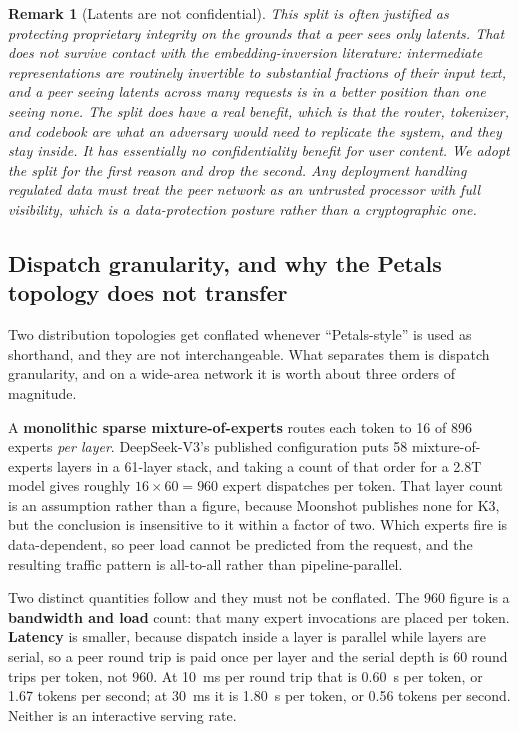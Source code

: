 \documentclass[11pt]{article}
\newtheorem{remark}{Remark}
\begin{document}
\begin{remark}[Latents are not confidential]
\label{rem:latentleak}
This split is often justified as protecting proprietary integrity on the grounds that a peer sees only latents. That does not survive contact with the embedding-inversion literature: intermediate representations are routinely invertible to substantial fractions of their input text, and a peer seeing latents across many requests is in a better position than one seeing none. The split does have a real benefit, which is that the router, tokenizer, and codebook are what an adversary would need to \emph{replicate} the system, and they stay inside. It has essentially no confidentiality benefit for user content. We adopt the split for the first reason and drop the second. Any deployment handling regulated data must treat the peer network as an untrusted processor with full visibility, which is a data-protection posture rather than a cryptographic one.
\end{remark}

\subsection{Dispatch granularity, and why the Petals topology does not transfer}
\label{sec:dispatch}

Two distribution topologies get conflated whenever ``Petals-style'' is used as shorthand, and they are not interchangeable. What separates them is dispatch granularity, and on a wide-area network it is worth about three orders of magnitude.

A \textbf{monolithic sparse mixture-of-experts} routes each token to 16 of 896 experts \emph{per layer}. DeepSeek-V3's published configuration puts 58 mixture-of-experts layers in a 61-layer stack, and taking a count of that order for a 2.8T model gives roughly $16 \times 60 = 960$ expert dispatches per token. That layer count is an assumption rather than a figure, because Moonshot publishes none for K3, but the conclusion is insensitive to it within a factor of two. Which experts fire is data-dependent, so peer load cannot be predicted from the request, and the resulting traffic pattern is all-to-all rather than pipeline-parallel.

Two distinct quantities follow and they must not be conflated. The 960 figure is a \textbf{bandwidth and load} count: that many expert invocations are placed per token. \textbf{Latency} is smaller, because dispatch inside a layer is parallel while layers are serial, so a peer round trip is paid once per layer and the serial depth is 60 round trips per token, not 960. At 10~ms per round trip that is 0.60~s per token, or 1.67 tokens per second; at 30~ms it is 1.80~s per token, or 0.56 tokens per second. Neither is an interactive serving rate.
\end{document}
